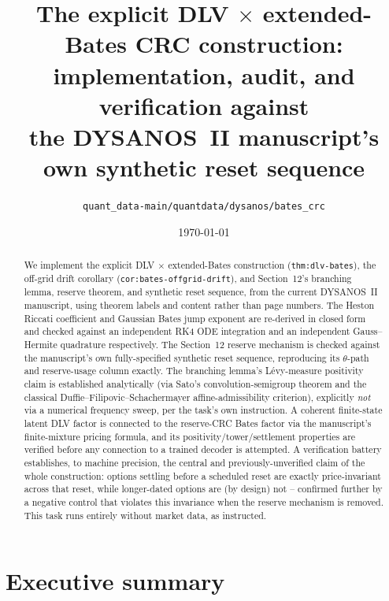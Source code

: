 \documentclass[11pt]{article}
\title{The explicit DLV $\times$ extended-Bates CRC construction:\\
implementation, audit, and verification against\\
the DYSANOS~II manuscript's own synthetic reset sequence}
\author{\texttt{quant\_data-main/quantdata/dysanos/bates\_crc}}
\date{\today}
\begin{document}
\maketitle

\begin{abstract}
We implement the explicit DLV $\times$ extended-Bates construction
(\texttt{thm:dlv-bates}), the off-grid drift corollary
(\texttt{cor:bates-offgrid-drift}), and Section~12's branching lemma,
reserve theorem, and synthetic reset sequence, from the current DYSANOS~II
manuscript, using theorem labels and content rather than page numbers. The
Heston Riccati coefficient and Gaussian Bates jump exponent are re-derived
in closed form and checked against an independent RK4 ODE integration and
an independent Gauss--Hermite quadrature respectively. The Section~12
reserve mechanism is checked against the manuscript's own fully-specified
synthetic reset sequence, reproducing its $\theta$-path and reserve-usage
column exactly. The branching lemma's L\'evy-measure positivity claim is
established analytically (via Sato's convolution-semigroup theorem and the
classical Duffie--Filipovic--Schachermayer affine-admissibility criterion),
explicitly \emph{not} via a numerical frequency sweep, per the task's own
instruction. A coherent finite-state latent DLV factor is connected to the
reserve-CRC Bates factor via the manuscript's finite-mixture pricing
formula, and its positivity/tower/settlement properties are verified before
any connection to a trained decoder is attempted. A verification battery
establishes, to machine precision, the central and previously-unverified
claim of the whole construction: options settling before a scheduled reset
are exactly price-invariant across that reset, while longer-dated options
are (by design) not -- confirmed further by a negative control that
violates this invariance when the reserve mechanism is removed. This task
runs entirely without market data, as instructed.
\end{abstract}

\tableofcontents

\section{Executive summary}
\label{sec:exec}
\end{document}
